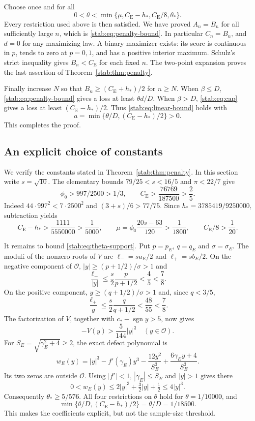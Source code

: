 \documentclass[11pt,a4paper]{article}
\numberwithin{equation}{section}
\theoremstyle{definition}
\theoremstyle{remark}
\newcommand{\CE}{C_{\mathrm E}}
\DeclareMathOperator{\sgn}{sgn}
\begin{document}
Choose once and for all
\[
 0<\theta<\min\{\mu,\CE-h_*,\CE/8,\theta_*\}.
\]
Every restriction used above is then satisfied. We have proved
$A_n=B_n$ for all sufficiently large $n$, which is
\eqref{stab:eq:penalty-bound}. In particular $C_n=B_n$, and $d=0$
for any maximizing law. A binary maximizer exists: its score is
continuous in $p$, tends to zero at $p=0,1$, and has a positive
interior maximum. Schulz's strict inequality \cite{Schulz2016} gives
$B_n<\CE$ for each fixed $n$. The two-point expansion proves the
last assertion of Theorem~\ref{stab:thm:penalty}.

Finally increase $N$ so that $B_n\ge(\CE+h_*)/2$ for $n\ge N$.
When $\beta\le D$, \eqref{stab:eq:penalty-bound} gives a loss at least
$\theta d/D$. When $\beta>D$, \eqref{stab:eq:cap} gives a loss at least
$(\CE-h_*)/2$. Thus \eqref{stab:eq:linear-bound} holds with
\[
                 a=\min\{\theta/D,(\CE-h_*)/2\}>0.
\]
This completes the proof.

\subsection{An explicit choice of constants}

We verify the constants stated in Theorem~\ref{stab:thm:penalty}. In this
section write $s=\sqrt{10}$. The elementary bounds
$79/25<s<16/5$ and $\pi<22/7$ give
\[
 \phi_0>997/2500>1/3,\qquad
 \CE>\frac{76769}{187500}>\frac25.
\]
Indeed $44\cdot997^2<7\cdot2500^2$ and $(3+s)/6>77/75$.
Since $h_*=3785419/9250000$, subtraction yields
\[
 \CE-h_*>\frac{1111}{5550000}>\frac1{5000},\qquad
 \mu=\phi_0\frac{20s-63}{120}>\frac1{1800},\qquad
 \CE/8>\frac1{20}.
\]

It remains to bound \eqref{stab:eq:theta-support}. Put $p=p_E$, $q=q_E$
and $\sigma=\sigma_E$. The moduli of the nonzero roots of $V$ are
$\ell_-=s a_E/2$ and $\ell_+=s b_E/2$. On the negative component
of $\mathcal O$, $|y|\ge(p+1/2)/\sigma>1$ and
\[
 \frac{\ell_-}{|y|}\le\frac s2\frac p{p+1/2}
                  <\frac45<\frac78.
\]
On the positive component, $y\ge(q+1/2)/\sigma>1$ and, since $q<3/5$,
\[
 \frac{\ell_+}{y}\le\frac s2\frac q{q+1/2}
                  <\frac{48}{55}<\frac78.
\]
The factorization of $V$, together with $c_*-\sgn y>5$, now gives
\[
                         -V(y)>\frac5{144}|y|^3\quad(y\in\mathcal O).
\]
For $S_E=\sqrt{\gamma_E^2+4}\ge2$, the exact defect polynomial is
\[
 w_E(y)=|y|^3-f'(\gamma_E)y^3-\frac{12y^2}{S_E^3}
                         +\frac{6\gamma_Ey+4}{S_E^3}.
\]
Its two zeros are outside $\mathcal O$. Using $|f'|<1$,
$|\gamma_E|\le S_E$ and $|y|>1$ gives there
\[
 0<w_E(y)\le2|y|^3+\tfrac32|y|+\tfrac12\le4|y|^3.
\]
Consequently $\theta_*\ge5/576$. All four restrictions on $\theta$
hold for $\theta=1/10000$, and
\[
 \min\{\theta/D,(\CE-h_*)/2\}=\theta/D=1/18500.
\]
This makes the coefficients explicit, but not the sample-size threshold.
\end{document}
